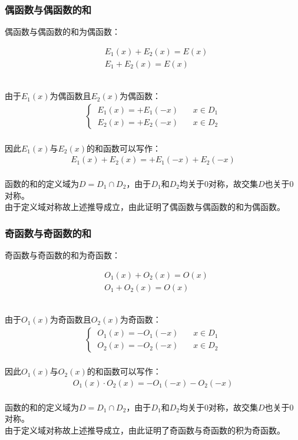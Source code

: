 \documentclass[UTF8]{ctexart}
\begin{document}
\subsubsection{偶函数与偶函数的和}
    \setcounter{equation}{0}
    偶函数与偶函数的和为偶函数：
    \begin{large}
        \begin{align*}
            &E_1(x)+E_2(x)=E(x)\\[3mm]
            &E_1+E_2(x)=E(x)
        \end{align*}
    \end{large}\\
    由于$E_1(x)$为偶函数且$E_2(x)$为偶函数：
    \begin{align}
        \begin{cases}
            ~E_1(x)=+E_1(-x)~~~~~~~~x\in D_1\\[1mm]
            ~E_2(x)=+E_2(-x)~~~~~~~~x\in D_2
        \end{cases}
    \end{align}\\
    因此$E_1(x)$与$E_2(x)$的和函数可以写作：
    \begin{align}
        E_1(x)+E_2(x)=+E_1(-x)+E_2(-x)
    \end{align}\\
    函数的和的定义域为$D=D_1\cap D_2$，由于$D_1$和$D_2$均关于$0$对称，故交集$D$也关于$0$对称。\\[3mm]
    由于定义域对称故上述推导成立，由此证明了偶函数与偶函数的和为偶函数。\vspace{8pt}

\subsubsection{奇函数与奇函数的和}
    \setcounter{equation}{0}
    奇函数与奇函数的和为奇函数：
    \begin{large}
        \begin{align*}
            &O_1(x)+O_2(x)=O(x)\\[3mm]
            &O_1+O_2(x)=O(x)
        \end{align*}
    \end{large}\\
    由于$O_1(x)$为奇函数且$O_2(x)$为奇函数：
    \begin{align}
        \begin{cases}
            ~O_1(x)=-O_1(-x)~~~~~~~~x\in D_1\\[1mm]
            ~O_2(x)=-O_2(-x)~~~~~~~~x\in D_2
        \end{cases}
    \end{align}\\
    因此$O_1(x)$与$O_2(x)$的和函数可以写作：
    \begin{align}
        O_1(x)\cdot O_2(x)=-O_1(-x)-O_2(-x)
    \end{align}\\
    函数的和的定义域为$D=D_1\cap D_2$，由于$D_1$和$D_2$均关于$0$对称，故交集$D$也关于$0$对称。\\[3mm]
    由于定义域对称故上述推导成立，由此证明了奇函数与奇函数的积为奇函数。
\end{document}
